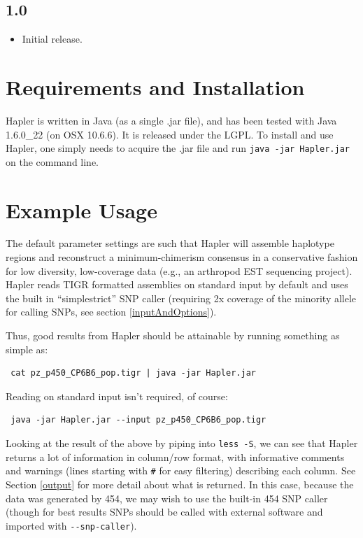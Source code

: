 \documentclass[11pt]{llncs}
\begin{document}
	\subsection*{1.0}
\begin{itemize}
\item Initial release.
\end{itemize}




\newpage

\section{Requirements and Installation}
\label{requirementsAndInstallation}

Hapler is written in Java (as a single .jar file), and has been tested with Java 1.6.0\_22 (on OSX 10.6.6). It is released under the LGPL. To install
and use Hapler, one simply needs to acquire the .jar file and run \texttt{java -jar Hapler.jar} on the command line.





\newpage

\section{Example Usage} 
\label{exampleUsage}

The default parameter settings are such that Hapler will assemble haplotype regions and reconstruct a minimum-chimerism consensus in a conservative 
fashion for low diversity, low-coverage data (e.g., an arthropod EST sequencing project). Hapler reads TIGR formatted assemblies on standard input by 
default and uses the built in ``simplestrict'' SNP caller (requiring 2x coverage of the minority allele for calling SNPs, see section \ref{inputAndOptions}).

Thus, good results from Hapler should be attainable by running something as simple as:

\begin{verbatim}
 cat pz_p450_CP6B6_pop.tigr | java -jar Hapler.jar
\end{verbatim}

Reading on standard input isn't required, of course:

\begin{verbatim}
 java -jar Hapler.jar --input pz_p450_CP6B6_pop.tigr
\end{verbatim}

Looking at the result of the above by piping into \verb=less -S=, we can see that Hapler returns a lot of information in column/row format, with 
informative comments and warnings (lines starting with \verb=#= for easy filtering) describing each column. See Section \ref{output} for more detail about what is 
returned. In this case, because the data was generated by 454, we may wish to use the built-in 454 SNP caller (though for best results SNPs should be
called with external software and imported with \verb=--snp-caller=).
\end{document}
